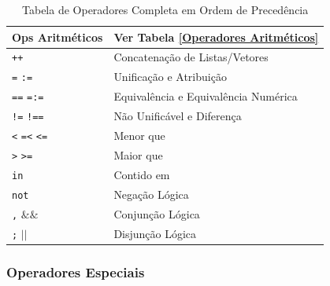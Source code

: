 \begin{frame}[fragile]

\begin{small}

	\begin{table}
		\caption{Tabela de Operadores Completa em Ordem de Precedência}
		\begin{center}
			\begin{tabular}{ p{2cm}| p{5cm} } \hline
				Ops Aritméticos & Ver Tabela \ref{Operadores Aritméticos}\\ \hline
				\verb-++-  & Concatenação de Listas/Vetores \\ \hline 
				\verb+=+  \verb+:=+  & Unificação e Atribuição\\ \hline
				\verb+==+ \verb+=:=+ & Equivalência e Equivalência Numérica\\ \hline
				\verb+!=+ \verb+!==+ & Não Unificável e Diferença\\ \hline
				\verb+<+  \verb+=<+ \verb+<=+ & Menor que\\ \hline
				\verb+>+  \verb+>=+ & Maior que\\ \hline
				\verb+in+ & Contido em\\ \hline
				\verb+not+ & Negação Lógica \\ \hline 
				\verb+,+  $\&\&$ & Conjunção Lógica \\ \hline 
				\verb+;+  $|$$|$ & Disjunção Lógica \\ \hline 
			\end{tabular}
		\end{center}
	\end{table}

\end{small}

\end{frame}


\subsubsection{Operadores Especiais}

